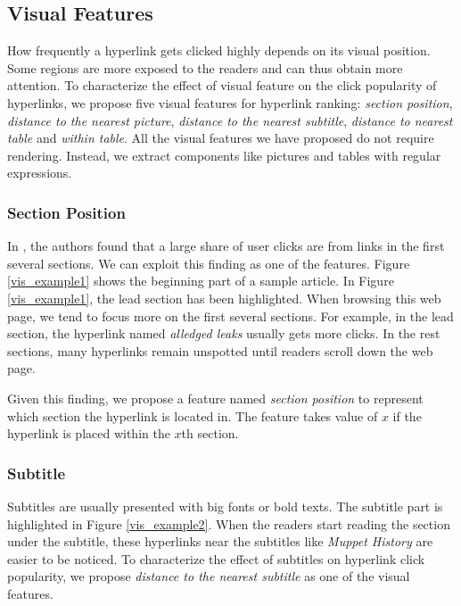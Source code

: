\subsection{Visual Features} \label{sec_vis_feature}

How frequently a hyperlink gets clicked highly depends on its visual position. Some regions are more exposed to the readers and can thus obtain more attention. To characterize the effect of visual feature on the click popularity of hyperlinks, we propose five visual features for hyperlink ranking: \emph{section position}, \emph{distance to the nearest picture}, \emph{distance to the nearest subtitle}, \emph{distance to nearest table} and \emph{within table}. All the visual features we have proposed do not require rendering. Instead, we extract components like pictures and tables with regular expressions.

\subsubsection{Section Position}

In \cite{lamprecht2017structure}, the authors found that a large share of user clicks are from links in the first several sections. We can exploit this finding as one of the features. Figure \ref{vis_example1} shows the beginning part of a sample article. In Figure \ref{vis_example1}, the lead section has been highlighted. When browsing this web page, we tend to focus more on the first several sections. For example, in the lead section, the hyperlink named \emph{alledged leaks} usually gets more clicks. In the rest sections, many hyperlinks remain unspotted until readers scroll down the web page. 

Given this finding, we propose a feature named \emph{section position} to represent which section the hyperlink is located in. The feature takes value of $x$ if the hyperlink is placed within the $x$th section. 

\subsubsection{Subtitle}

Subtitles are usually presented with big fonts or bold texts. The subtitle part is highlighted in Figure \ref{vis_example2}. When the readers start reading the section under the subtitle, these hyperlinks near the subtitles like \emph{Muppet History} are easier to be noticed. To characterize the effect of subtitles on hyperlink click popularity, we propose \emph{distance to the nearest subtitle} as one of the visual features.


